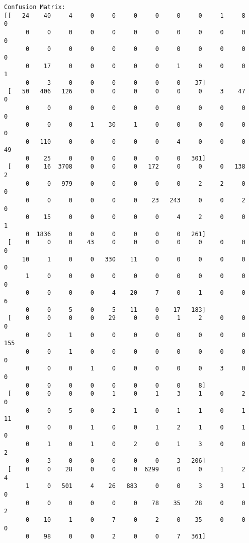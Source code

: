 \documentclass[11pt]{article}
\begin{document}
    \begin{Verbatim}[commandchars=\\\{\}]
Confusion Matrix:
[[   24    40     4     0     0     0     0     0     0     1     8     0
      0     0     0     0     0     0     0     0     0     0     0     0
      0     0     0     0     0     0     0     0     0     0     0     0
      0    17     0     0     0     0     0     1     0     0     0     1
      0     3     0     0     0     0     0     0    37]
 [   50   406   126     0     0     0     0     0     0     3    47     0
      0     0     0     0     0     0     0     0     0     0     0     0
      0     0     0     1    30     1     0     0     0     0     0     0
      0   110     0     0     0     0     0     4     0     0     0    49
      0    25     0     0     0     0     0     0   301]
 [    0    16  3708     0     0     0   172     0     0     0   138     2
      0     0   979     0     0     0     0     0     2     2     0     0
      0     0     0     0     0     0    23   243     0     0     2     0
      0    15     0     0     0     0     0     4     2     0     0     1
      0  1836     0     0     0     0     0     0   261]
 [    0     0     0    43     0     0     0     0     0     0     0     0
     10     1     0     0   330    11     0     0     0     0     0     0
      1     0     0     0     0     0     0     0     0     0     0     0
      0     0     0     0     4    20     7     0     1     0     0     6
      0     0     5     0     5    11     0    17   183]
 [    0     0     0     0    29     0     0     1     2     0     0     0
      0     0     1     0     0     0     0     0     0     0     0   155
      0     0     1     0     0     0     0     0     0     0     0     0
      0     0     0     1     0     0     0     0     0     3     0     0
      0     0     0     0     0     0     0     0     8]
 [    0     0     0     0     1     0     1     3     1     0     2     0
      0     0     5     0     2     1     0     1     1     0     1    11
      0     0     0     1     0     0     1     2     1     0     1     0
      0     1     0     1     0     2     0     1     3     0     0     2
      0     3     0     0     0     0     0     3   206]
 [    0     0    28     0     0     0  6299     0     0     1     2     4
      1     0   501     4    26   883     0     0     3     3     1     0
      0     0     0     0     0     0    78    35    28     0     0     2
      0    10     1     0     7     0     2     0    35     0     0     0
      0    98     0     0     2     0     0     7   361]

\end{Verbatim}
\end{document}
